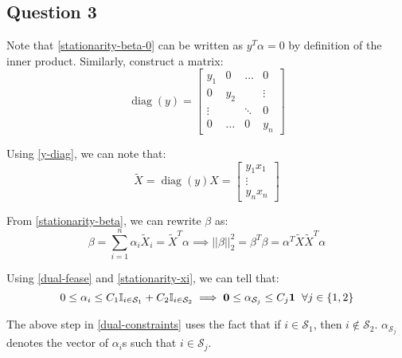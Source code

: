 \documentclass{article}
\newcommand{\xtilde}{\widetilde{X}}
\newcommand{\indi}{\mathbb{I}}
\newcommand{\setS}{\mathcal{S}}
\begin{document}
\subsection*{Question 3}
\begin{flushleft}
Note that \ref{stationarity-beta-0} can be written as \(y^{T}\alpha = 0\) by definition of the inner product. Similarly, construct a matrix:
\begin{equation}
\label{y-diag}
\mathop{diag}(y) = \begin{bmatrix} y_{1} & 0 & \ldots & 0 \\ 0 & y_{2} & & \vdots \\ \vdots & & \ddots & 0 \\ 0 & \ldots & 0 & y_{n} \end{bmatrix} 
\end{equation}

Using \ref{y-diag}, we can note that:
\begin{equation}
\label{x-tilde}
\xtilde = \mathop{diag}(y)X = \begin{bmatrix} y_{1}x_{1} \\ \vdots \\ y_{n}x_{n} \end{bmatrix}
\end{equation}

From \ref{stationarity-beta}, we can rewrite \(\beta\) as:
\begin{equation}
\label{beta-x-tilde}
\beta = \sum_{i=1}^{n} \alpha_{i}\xtilde_{i} = \xtilde^{T}\alpha \implies ||\beta||_{2}^{2} = \beta^{T}\beta = \alpha^{T}\xtilde\xtilde^{T}\alpha
\end{equation}

Using \ref{dual-fease} and \ref{stationarity-xi}, we can tell that:
\begin{equation}
\label{dual-constraints}
0 \leq \alpha_{i} \leq C_{1}\indi_{i \in \setS_{1}} + C_{2}\indi_{i \in \setS_{2}} \implies \mathbf{0} \leq \alpha_{\setS_{j}} \leq C_{j}\mathbf{1} \hspace{2mm} \forall j \in \{1, 2\}
\end{equation}

The above step in \ref{dual-constraints} uses the fact that if \(i \in \setS_{1}\), then \(i \notin \setS_{2}\). \(\alpha_{\setS_{j}}\) denotes the vector of \(\alpha_{i}\)s such that \(i \in \setS_{j}\).


\end{flushleft}
\end{document}
